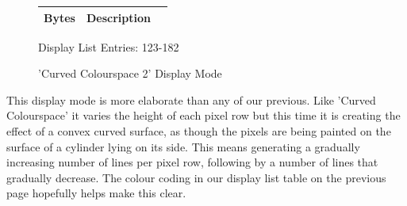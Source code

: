 \begin{minipage}[b]{0.31\linewidth}
  \begin{figure}[H]
    {
      \setlength{\tabcolsep}{3.0pt}
      \setlength\cmidrulewidth{\heavyrulewidth} %
      \begin{adjustbox}{height=8.5cm}

        \begin{tabular}{lll}
          \toprule
          Bytes       & Description                                                         \\
          \midrule
        \end{tabular}

      \end{adjustbox}

    }\caption*{Display List Entries: 123-182}
  \end{figure}
\end{minipage}

\clearpage
\begin{figure}[H]
    \centering
    \begin{adjustbox}{width=12cm,center}
    \end{adjustbox}
\caption{'Curved Colourspace 2' Display Mode}
\end{figure}

This display mode is more elaborate than any of our previous. Like 'Curved Colourspace' it varies the height of
each pixel row but this time it is creating the effect of a convex curved surface, as though the pixels are being
painted on the surface of a cylinder lying on its side. This means generating a gradually increasing number of lines
per pixel row, following by a number of lines that gradually decrease. The colour coding in our display list table on the
previous page hopefully helps make this clear.

